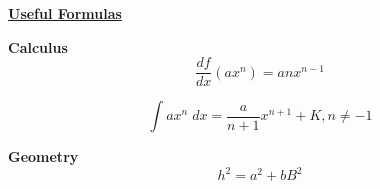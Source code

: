 


\begin{center}
\Large \textbf{\underline{Useful Formulas}}\\
\end{center}

\noindent \textbf{Calculus}\\

\begin{equation*}
\frac{df}{dx} \left( ax^n \right) = anx^{n-1}
\end{equation*}

\begin{equation*}
	\int a x^n \; dx = \frac{a}{n+1} x^{n+1} + K, n \neq -1
\end{equation*}

\noindent \textbf{Geometry}\\

\begin{equation*}
	h^2 = a^2 + bB^2
\end{equation*}